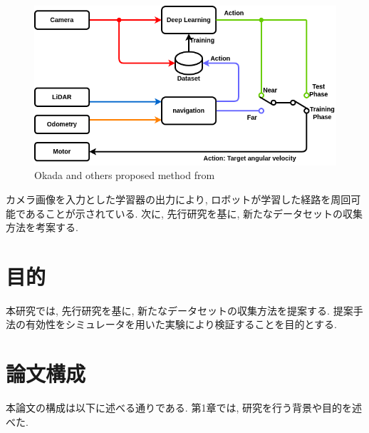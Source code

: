 \begin{figure}[h]
     \centering
     \includegraphics[keepaspectratio, scale=0.45]
     {images/okada-method.png}
     \caption{Okada and others proposed method from \cite{okada-si}}
     \label{Fig:okada-method}
     \end{figure}

カメラ画像を入力とした学習器の出力により, ロボットが学習した経路を周回可能であることが示されている. 次に, 先行研究を基に, 新たなデータセットの収集方法を考案する.

\section{目的}
本研究では, 先行研究を基に, 新たなデータセットの収集方法を提案する. 提案手法の有効性をシミュレータを用いた実験により検証することを目的とする. 

\section{論文構成}
本論文の構成は以下に述べる通りである. 第1章では, 研究を行う背景や目的を述べた. 
     
